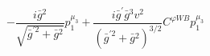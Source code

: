 %
\begin{dmath*}
%
  -  \frac{i {\bar g}{}^2}{\sqrt{{\bar g}^{\prime 2} + {\bar g}{}^2}}p_1^{\mu_3}  +  \frac{i {\bar g}^\prime {\bar g}{}^3 v^2}{\left({\bar g}^{\prime 2} + {\bar g}{}^2\right)^{3/2}}C^{ \varphi  WB} p_1^{\mu_3}
%
\end{dmath*}
%
